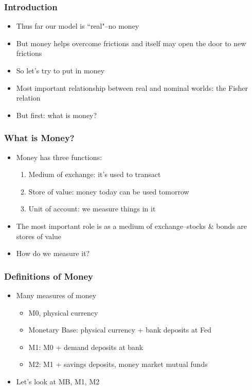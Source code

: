\documentclass{beamer}
\author{Trevor S. Gallen}
\date{}
\begin{document}
\renewcommand*{\inserttotalframenumber}{\pageref{lastframe}}



\begin{frame}
\titlepage
\end{frame}

\begin{frame}
\frametitle[alignment=center]{Introduction}
\begin{itemize}
\item Thus far our model is ``real"--no money
\bigskip
\item But money helps overcome frictions and itself may open the door to new frictions
\bigskip
\item So let's try to put in money
\bigskip
\item Most important relationship between real and nominal worlds: the Fisher relation
\bigskip
\item But first: what is money?
\end{itemize}
\end{frame}

\begin{frame}
\frametitle[alignment=center]{What is Money?}
\begin{itemize}
\item Money has three functions:
\begin{enumerate}
\item Medium of exchange:  it's used to transact
\item Store of value: money today can be used tomorrow
\item Unit of account: we measure things in it
\end{enumerate}
\item The most important role is as a medium of exchange--stocks \& bonds are stores of value
\bigskip
\item How do we measure it?
\end{itemize}
\end{frame}

\begin{frame}
\frametitle[alignment=center]{Definitions of Money}
\begin{itemize}
\item Many measures of money
\begin{itemize}
\item M0, physical currency
\item Monetary Base: physical currency + bank deposits at Fed
\item M1:  M0 + demand deposits at bank
\item M2:  M1 + savings deposits, money market mutual funds
\end{itemize}
\item Let's look at MB, M1, M2
\end{itemize}
\end{frame}
\end{document}
